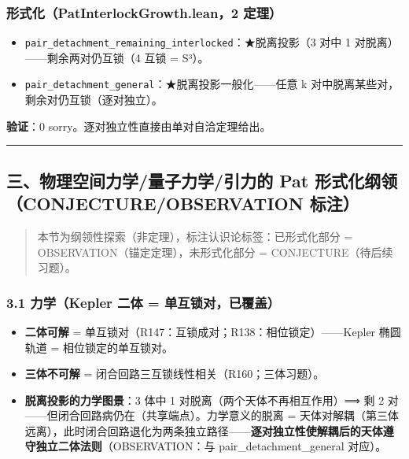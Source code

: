 \documentclass[
]{article}
\providecommand{\tightlist}{%
  \setlength{\itemsep}{0pt}\setlength{\parskip}{0pt}}
\begin{document}
\subsubsection{形式化（PatInterlockGrowth.lean，2
定理）}\label{ux5f62ux5f0fux5316patinterlockgrowth.lean2-ux5b9aux7406}

\begin{itemize}
\tightlist
\item
  \texttt{pair\_detachment\_remaining\_interlocked}：★脱离投影（3 对中 1
  对脱离）------剩余两对仍互锁（4 互锁 = S³）。
\item
  \texttt{pair\_detachment\_general}：★脱离投影一般化------任意 k
  对中脱离某些对，剩余对仍互锁（逐对独立）。
\end{itemize}

\textbf{验证}：0 sorry。逐对独立性直接由单对自洽定理给出。

\begin{center}\rule{0.5\linewidth}{0.5pt}\end{center}

\subsection{三、物理空间力学/量子力学/引力的 Pat
形式化纲领（CONJECTURE/OBSERVATION
标注）}\label{ux4e09ux7269ux7406ux7a7aux95f4ux529bux5b66ux91cfux5b50ux529bux5b66ux5f15ux529bux7684-pat-ux5f62ux5f0fux5316ux7eb2ux9886conjectureobservation-ux6807ux6ce8}

\begin{quote}
本节为纲领性探索（非定理），标注认识论标签：已形式化部分 =
OBSERVATION（锚定定理），未形式化部分 = CONJECTURE（待后续习题）。
\end{quote}

\subsubsection{3.1 力学（Kepler 二体 =
单互锁对，已覆盖）}\label{ux529bux5b66kepler-ux4e8cux4f53-ux5355ux4e92ux9501ux5bf9ux5df2ux8986ux76d6}

\begin{itemize}
\tightlist
\item
  \textbf{二体可解} =
  单互锁对（R147：互锁成对；R138：相位锁定）------Kepler 椭圆轨道 =
  相位锁定的单互锁对。
\item
  \textbf{三体不可解} = 闭合回路三互锁线性相关（R160；三体习题）。
\item
  \textbf{脱离投影的力学图景}：3 体中 1 对脱离（两个天体不再相互作用）⟹
  剩 2 对------但闭合回路病仍在（共享端点）。力学意义的脱离 =
  天体对解耦（第三体远离），此时闭合回路退化为两条独立路径------\textbf{逐对独立性使解耦后的天体遵守独立二体法则}（OBSERVATION：与
  pair\_detachment\_general 对应）。
\end{itemize}
\end{document}
